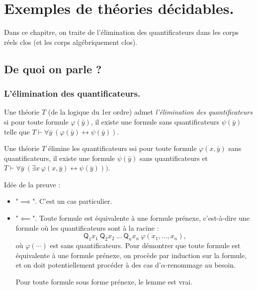 \documentclass[./main]{subfiles}
\begin{document}
  \chapter{Exemples de théories décidables.}

  Dans ce chapitre, on traite de l'élimination des quantificateurs dans les corps réels clos (et les corps algébriquement clos).

  \section{De quoi on parle ?}
  \subsection{L'élimination des quantificateurs.}



  \begin{defn}
    Une théorie $T$ (de la logique du 1er ordre) admet \textit{l'élimination des quantificateurs} si pour toute formule $\varphi(\bar{y})$, il existe une formule sans quantificateurs $\psi(\bar{y})$ telle que $T \vdash \forall \bar{y} \: (\varphi(\bar{y}) \leftrightarrow \psi(\bar{y}))$.
  \end{defn}

  \begin{lem}
    Une théorie $T$ élimine les quantificateurs ssi pour toute formule $\varphi(x, \bar{y})$ sans quantificateurs, il existe une formule $\psi(\bar{y})$ sans quantificateurs et $T \vdash \forall \bar{y}\: (\exists x \: \varphi(x, \bar{y}) \leftrightarrow \psi(\bar{y})))$.
  \end{lem}
  \begin{prv}
    Idée de la preuve :
    \begin{itemize}
      \item "$\implies$". C'est un cas particulier.
      \item "$\impliedby$".
        Toute formule est équivalente à une formule prénexe, c'est-à-dire une formule où les quantificateurs sont à la racine :
        \[
        \mathsf{Q}_1 x_1 \: \mathsf{Q}_2 x_2 \:\ldots \: \mathsf{Q}_n x_n \: \varphi(x_1, \ldots, x_n)
        ,\] 
        où $\varphi(\cdots)$ est sans quantificateurs.
        Pour démontrer que toute formule est équivalente à une formule prénexe, on procède par induction sur la formule, et on doit potentiellement procéder à des cas d'$\alpha$-renommage au besoin.


        Pour toute formule sous forme prénexe, le lemme est vrai.
    \end{itemize}
  \end{prv}
\end{document}
